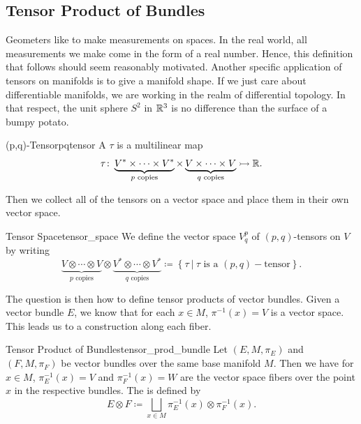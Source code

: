 
\subsection{Tensor Product of Bundles}

Geometers like to make measurements on spaces.  In the real world, all measurements we make come in the form of a real number.  Hence, this definition that follows should seem reasonably motivated. Another specific application of tensors on manifolds is to give a manifold shape.  If we just care about differentiable manifolds, we are working in the realm of differential topology.  In that respect, the unit sphere $S^2$ in $\mathbb{R}^3$ is no difference than the surface of a bumpy potato.

\begin{df}{(p,q)-Tensor}{pqtensor}
A  $\tau$ is a multilinear map
\[
\tau\colon \underbrace{V^*\times \cdots \times V^*}_{\textrm{$p$ copies}}\times \underbrace{V\times \cdots \times V}_{\textrm{$q$ copies}} \rightarrowtail \mathbb{R}.
\]
\end{df}

Then we collect all of the tensors on a vector space and place them in their own vector space.

\begin{df}{Tensor Space}{tensor_space}
We define the vector space $V^p_q$ of $(p,q)$-tensors on $V$ by writing
\[
\underbrace{V\otimes \cdots \otimes V}_{\textrm{$p$ copies}} \otimes \underbrace{V^*\otimes \cdots \otimes V^*}_{\textrm{$q$ copies}} \coloneqq \left\{ \tau ~\vert~ \textrm{$\tau$ is a $(p,q)-$tensor}\right\}.
\]
\end{df}

The question is then how to define tensor products of vector bundles.  Given a vector bundle $E$, we know that for each $x\in M$, $\pi^{-1}(x)=V$ is a vector space.  This leads us to a construction along each fiber. 

\begin{df}{Tensor Product of Bundles}{tensor_prod_bundle}
Let $(E,M,\pi_E)$ and $(F,M,\pi_F)$ be vector bundles over the same base manifold $M$.  Then we have for $x\in M$, $\pi_E^{-1}(x)=V$ and $\pi_F^{-1}(x)=W$ are the vector space fibers over the point $x$ in the respective bundles. The  is defined by
\[
E\otimes F \coloneqq \bigsqcup_{x\in M} \pi_E^{-1}(x)\otimes \pi_F^{-1}(x).
\]
\end{df}

